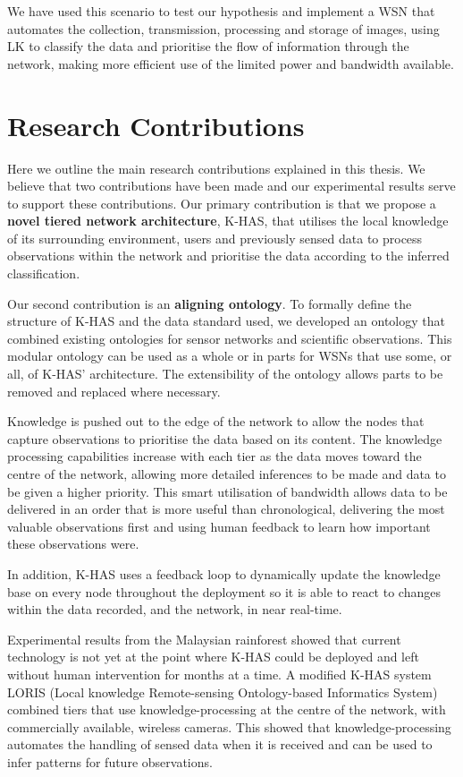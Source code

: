 We have used this scenario to test our hypothesis and implement a WSN that automates the collection, transmission, processing and storage of images, using LK to classify the data and prioritise the flow of information through the network, making more efficient use of the limited power and bandwidth available. 

\section{Research Contributions}

Here we outline the main research contributions explained in this thesis. We believe that two contributions have been made and our experimental results serve to support these contributions.
Our primary contribution is that we propose a \textbf{novel tiered network architecture}, K-HAS, that utilises the local knowledge of its surrounding environment, users and previously sensed data to process observations within the network and prioritise the data according to the inferred classification. 

Our second contribution is an \textbf{aligning ontology}. To formally define the structure of K-HAS and the data standard used, we developed an ontology that combined existing ontologies for sensor networks and scientific observations. This modular ontology can be used as a whole or in parts for WSNs that use some, or all, of K-HAS' architecture. The extensibility of the ontology allows parts to be removed and replaced where necessary.

Knowledge is pushed out to the edge of the network to allow the nodes that capture observations to prioritise the data based on its content. The knowledge processing capabilities increase with each tier as the data moves toward the centre of the network, allowing more detailed inferences to be made and data to be given a higher priority. This smart utilisation of bandwidth allows data to be delivered in an order that is more useful than chronological, delivering the most valuable observations first and using human feedback to learn how important these observations were. 

In addition, K-HAS uses a feedback loop to dynamically update the knowledge base on every node throughout the deployment so it is able to react to changes within the data recorded, and the network, in near real-time.

Experimental results from the Malaysian rainforest showed that current technology is not yet at the point where K-HAS could be deployed and left without human intervention for months at a time. A modified K-HAS system LORIS (Local knowledge Remote-sensing Ontology-based Informatics System) combined tiers that use knowledge-processing at the centre of the network, with commercially available, wireless cameras. This showed that knowledge-processing automates the handling of sensed data when it is received and can be used to infer patterns for future observations.

